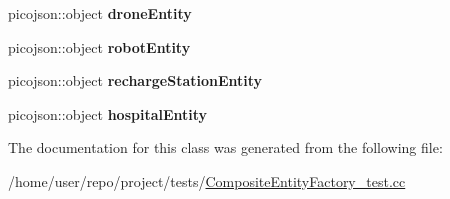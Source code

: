 \begin{DoxyCompactItemize}
\item 
\mbox{\label{classCompositeEntityFactoryTest_aa9ddf0a2dd79d934e10cca3f89e4891d}} 
picojson\+::object {\bfseries drone\+Entity}
\item 
\mbox{\label{classCompositeEntityFactoryTest_a49fa0641b2f146d5d72f6c0ae27dd825}} 
picojson\+::object {\bfseries robot\+Entity}
\item 
\mbox{\label{classCompositeEntityFactoryTest_a66b5b10cbd1a65f78c9a8383b5160202}} 
picojson\+::object {\bfseries recharge\+Station\+Entity}
\item 
\mbox{\label{classCompositeEntityFactoryTest_a54fe5751dddd55330b2e2f26f78083a3}} 
picojson\+::object {\bfseries hospital\+Entity}
\end{DoxyCompactItemize}


The documentation for this class was generated from the following file\+:\begin{DoxyCompactItemize}
\item 
/home/user/repo/project/tests/\hyperlink{CompositeEntityFactory__test_8cc}{Composite\+Entity\+Factory\+\_\+test.\+cc}\end{DoxyCompactItemize}
